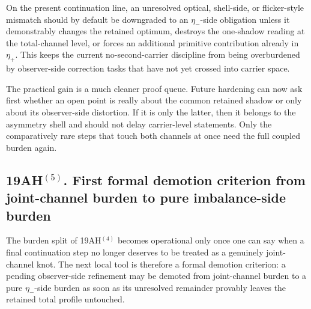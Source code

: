\begin{corollary}
On the present continuation line, an unresolved optical, shell-side, or flicker-style mismatch should by default be downgraded to an \(\eta_-\)-side obligation unless it demonstrably changes the retained optimum, destroys the one-shadow reading at the total-channel level, or forces an additional primitive contribution already in \(\eta_+\). This keeps the current no-second-carrier discipline from being overburdened by observer-side correction tasks that have not yet crossed into carrier space.
\end{corollary}

\begin{remark}
The practical gain is a much cleaner proof queue. Future hardening can now ask first whether an open point is really about the common retained shadow or only about its observer-side distortion. If it is only the latter, then it belongs to the asymmetry shell and should not delay carrier-level statements. Only the comparatively rare steps that touch both channels at once need the full coupled burden again.
\end{remark}

\subsection*{19AH$^{(5)}$. First formal demotion criterion from joint-channel burden to pure imbalance-side burden}
The burden split of 19AH$^{(4)}$ becomes operational only once one can say when a final continuation step no longer deserves to be treated as a genuinely joint-channel knot. The next local tool is therefore a formal demotion criterion: a pending observer-side refinement may be demoted from joint-channel burden to a pure \(\eta_-\)-side burden as soon as its unresolved remainder provably leaves the retained total profile untouched.

